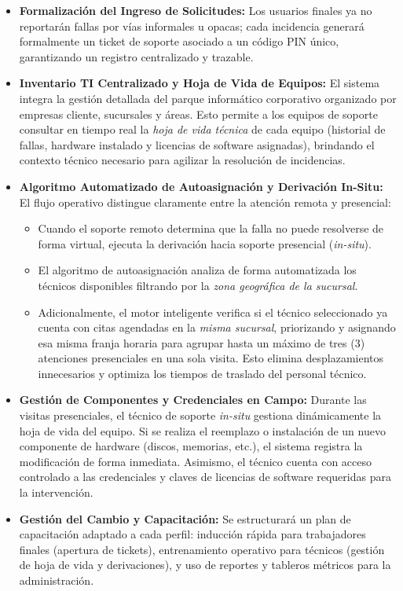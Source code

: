 \begin{itemize}
\item \textbf{Formalización del Ingreso de Solicitudes:} Los usuarios finales ya no reportarán fallas por vías informales u opacas; cada incidencia generará formalmente un ticket de soporte asociado a un código PIN único, garantizando un registro centralizado y trazable.

\item \textbf{Inventario TI Centralizado y Hoja de Vida de Equipos:} El sistema integra la gestión detallada del parque informático corporativo organizado por empresas cliente, sucursales y áreas. Esto permite a los equipos de soporte consultar en tiempo real la \textit{hoja de vida técnica} de cada equipo (historial de fallas, hardware instalado y licencias de software asignadas), brindando el contexto técnico necesario para agilizar la resolución de incidencias.

\item \textbf{Algoritmo Automatizado de Autoasignación y Derivación In-Situ:} 
El flujo operativo distingue claramente entre la atención remota y presencial:
\begin{itemize}
    \item Cuando el soporte remoto determina que la falla no puede resolverse de forma virtual, ejecuta la derivación hacia soporte presencial (\textit{in-situ}).
    \item El algoritmo de autoasignación analiza de forma automatizada los técnicos disponibles filtrando por la \textit{zona geográfica de la sucursal}.
    \item Adicionalmente, el motor inteligente verifica si el técnico seleccionado ya cuenta con citas agendadas en la \textit{misma sucursal}, priorizando y asignando esa misma franja horaria para agrupar hasta un máximo de tres (3) atenciones presenciales en una sola visita. Esto elimina desplazamientos innecesarios y optimiza los tiempos de traslado del personal técnico.
\end{itemize}

\item \textbf{Gestión de Componentes y Credenciales en Campo:} Durante las visitas presenciales, el técnico de soporte \textit{in-situ} gestiona dinámicamente la hoja de vida del equipo. Si se realiza el reemplazo o instalación de un nuevo componente de hardware (discos, memorias, etc.), el sistema registra la modificación de forma inmediata. Asimismo, el técnico cuenta con acceso controlado a las credenciales y claves de licencias de software requeridas para la intervención.

\item \textbf{Gestión del Cambio y Capacitación:} Se estructurará un plan de capacitación adaptado a cada perfil: inducción rápida para trabajadores finales (apertura de tickets), entrenamiento operativo para técnicos (gestión de hoja de vida y derivaciones), y uso de reportes y tableros métricos para la administración.

\end{itemize}

